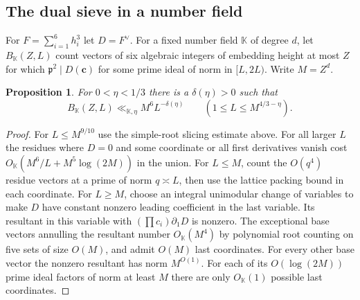 \documentclass[11pt,letterpaper]{article}
\newtheorem{proposition}[proposition]{Proposition}
\theoremstyle{definition}
\numberwithin{equation}{section}
\begin{document}
\subsection{The dual sieve in a number field}\label{nf3:sfstrength}
For $F=\sum_{i=1}^6h_i^3$ let $D=F^\vee$. For a fixed number field
$\mathbb K$ of degree $d$, let $B_{\mathbb K}(Z,L)$ count vectors of six
algebraic integers of embedding height at most $Z$ for which
$\mathfrak p^2\mid D(\mathbf c)$ for some prime ideal of norm in
$[L,2L)$. Write $M=Z^d$.

\begin{proposition}\label{nf3:sfprop}
For $0<\eta<1/3$ there is a $\delta(\eta)>0$ such that
\[
 B_{\mathbb K}(Z,L)\ll_{\mathbb K,\eta} M^6 L^{-\delta(\eta)}
       \qquad(1\le L\le M^{4/3-\eta}).
\]
\end{proposition}
\begin{proof}
For $L\le M^{9/10}$ use the simple-root slicing estimate above.
For all larger $L$ the residues where $D=0$ and some coordinate or all
first derivatives vanish cost $O_{\mathbb K}(M^6/L+M^5\log(2M))$ in
the union. For $L\le M$, count the $O(q^4)$ residue vectors at a prime
of norm $q\asymp L$, then use the lattice packing bound in each
coordinate. For $L\ge M$, choose an integral unimodular change of variables
to make $D$ have constant nonzero leading coefficient in the last variable.
Its resultant in this variable with $(\prod c_i)\partial_1D$ is nonzero.
The exceptional base vectors annulling the resultant number
$O_{\mathbb K}(M^4)$ by polynomial root counting on five sets of size
$O(M)$, and admit $O(M)$ last coordinates. For every other base vector
the nonzero resultant has norm $M^{O(1)}$. For each of its $O(\log(2M))$
prime ideal factors of norm at least $M$ there are only
$O_{\mathbb K}(1)$ possible last coordinates.


\end{proof}
\end{document}
